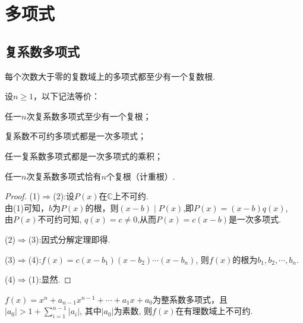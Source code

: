 \section{多项式}

\subsection{复系数多项式}

\begin{theorem}[代数基本定理]
  每个次数大于零的复数域上的多项式都至少有一个复数根.
\end{theorem}
\begin{deduction}
  设$n \geq 1$，以下记法等价：
  \begin{asparaenum}[(1)]
  \item 任一$n$次复系数多项式至少有一个复根；
  \item 复系数不可约多项式都是一次多项式；
  \item 任一复系数多项式都是一次多项式的乘积；
  \item 任一$n$次复系数多项式恰有$n$个复根（计重根）.
  \end{asparaenum}
\end{deduction}
\begin{proof}
  (1)$\Longrightarrow$(2):设$P(x)$在$\mathbb{C}$上不可约.\\
  由(1)可知，$b$为$P(x)$的根，则$(x-b)\mid P(x)$,即$P(x)=(x-b)q(x)$,\\
  由$P(x)$不可约可知, $q(x)=c\neq 0$,从而$P(x)=c(x-b)$是一次多项式.

  (2)$\Longrightarrow$(3):因式分解定理即得.

  (3)$\Longrightarrow$(4):$f(x)=c(x-b_1)(x-b_2)\cdots(x-b_n)$,
  则$f(x)$的根为$b_1,b_2,\cdots,b_n$.

  (4)$\Longrightarrow$(1):显然.
\end{proof}
\begin{theorem}[Osada]
  $f(x)=x^n+a_{n-1}x^{n-1}+\cdots+a_1x+a_0$为整系数多项式，且\\
  $|a_0|>1+\sum\limits^{n-1}_{i=1}|a_i|$, 其中$|a_0|$为素数,
  则$f(x)$在有理数域上不可约.
\end{theorem}

